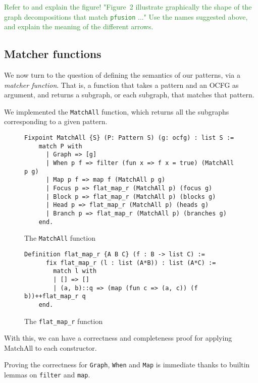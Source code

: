 \documentclass[11pt]{article}
\newcommand{\inlinecoq}[1]{\mbox{\lstinline[style=customcoq,columns=fixed,basewidth=.48em]{#1}}}
\newcommand{\ilc}[1]{\inlinecoq{#1}}
\newcommand{\yz}[1]{\textcolor{ForestGreen}{#1}}
\begin{document}
\yz{Refer to and explain the figure! "Figure~2 illustrate graphically the shape of the graph decompositions that match \ilc{pfusion} ..." Use the names suggested above, and explain the meaning of the different arrows.}

\subsection{Matcher functions}
\label{sec:matcher}

We now turn to the question of defining the semantics of our patterns, via a \emph{matcher function}. That is, a function that takes a pattern and an OCFG as argument, and returns a subgraph, or each subgraph, that matches that pattern.

We implemented the \ilc{MatchAll} function, which returns all the subgraphs corresponding to a given pattern.

\begin{figure}[H]
  \label{fig:match}
  \begin{lstlisting}[style=customcoq,basicstyle=\small\ttfamily]
    Fixpoint MatchAll {S} (P: Pattern S) (g: ocfg) : list S :=
    match P with
      | Graph => [g]
      | When p f => filter (fun x => f x = true) (MatchAll p g) 
      | Map p f => map f (MatchAll p g)
      | Focus p => flat_map_r (MatchAll p) (focus g)
      | Block p => flat_map_r (MatchAll p) (blocks g)
      | Head p => flat_map_r (MatchAll p) (heads g)
      | Branch p => flat_map_r (MatchAll p) (branches g)
    end.
  \end{lstlisting}
  \caption{The \ilc{MatchAll} function}
\end{figure}

\begin{figure}[h]
  \label{fig:fmapr}
  \begin{lstlisting}[style=customcoq,basicstyle=\small\ttfamily]
    Definition flat_map_r {A B C} (f : B -> list C) :=
      fix flat_map_r (l : list (A*B)) : list (A*C) :=
        match l with
        | [] => []
        | (a, b)::q => (map (fun c => (a, c)) (f b))++flat_map_r q
    end.
  \end{lstlisting}
  \caption{The \ilc{flat_map_r} function}
\end{figure}

\noindent
With this, we can have a correctness and completeness proof for applying MatchAll to each constructor.

Proving the correctness for \ilc{Graph}, \ilc{When} and \ilc{Map} is immediate thanks to builtin lemmas on \ilc{filter} and \ilc{map}.
\end{document}

